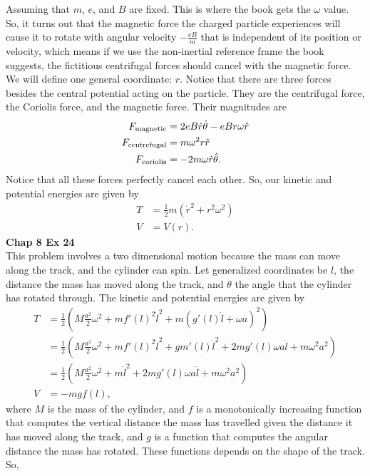 \documentclass[10pt]{article}
\begin{document}
Assuming that $m$, $e$, and $B$ are fixed.  This is where the book gets the $\omega$ value.  So, it turns
out that the magnetic force the charged particle experiences will cause it to rotate with angular velocity 
$-\frac{eB}{m}$ that is independent of its position or velocity, which means if we use the non-inertial
reference frame the book suggests, the fictitious centrifugal forces should cancel with the magnetic force.  
We will define one general coordinate: $r$.  Notice that there are three forces besides the central potential
acting on the particle.  They are the centrifugal force, the Coriolis force, and the magnetic force.  Their magnitudes are
\begin{align*}
  F_{\rm{magnetic}} &= 2eB\dot r\hat\theta- eBr\omega\hat r\\
  F_{\rm{centrefugal}} &= m\omega^2 r\hat r\\
  F_{\rm{coriolis}} &= -2m\omega\dot r\hat\theta.
\end{align*}
Notice that all these forces perfectly cancel each other. So, our kinetic and potential energies are given by
\begin{align*}
  T &= \frac{1}{2}m(\dot r^2+r^2\omega^2)\\
  V &= V(r).
\end{align*}
\textbf{Chap 8 Ex 24}\\
This problem involves a two dimensional motion because the mass can move along the track, and
the cylinder can spin.  Let generalized coordinates be $l$, the distance the mass has moved along
the track, and $\theta$ the angle that the cylinder has rotated through.  The kinetic and potential
energies are given by
\begin{align*}
  T &= \frac{1}{2} \left( M\frac{a^2}{2}\omega^2+mf'(l)^2\dot l^2+m(g'(l)\dot l+\omega a)^2 \right)\\
    &= \frac{1}{2} \left( M\frac{a^2}{2}\omega^2+mf'(l)^2\dot l^2+gm'(l)\dot l^2 + 2mg'(l)\omega a\dot l + m\omega^2 a^2 \right)\\
    &= \frac{1}{2} \left( M\frac{a^2}{2}\omega^2+m\dot l^2 + 2mg'(l)\omega a\dot l + m\omega^2 a^2 \right)\\
  V &= -mgf(l),
\end{align*}
where $M$ is the mass of the cylinder, and $f$ is a monotonically increasing function that computes the vertical
distance the mass has travelled given the distance it has moved along the track, and $g$ is a function that 
computes the angular distance the mass has rotated.  These functions depends on the shape of the track.  So, 
\end{document}

